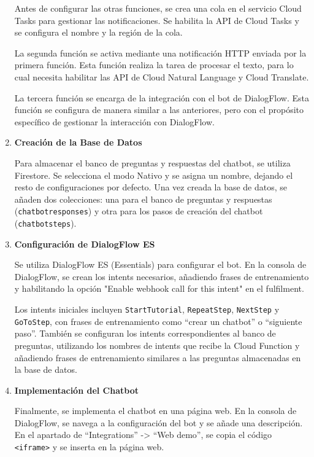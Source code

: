 \begin{enumerate}
Antes de configurar las otras funciones, se crea una cola en el servicio Cloud Tasks para gestionar las notificaciones. Se habilita la API de Cloud Tasks y se configura el nombre y la región de la cola.

La segunda función se activa mediante una notificación HTTP enviada por la primera función. Esta función realiza la tarea de procesar el texto, para lo cual necesita habilitar las API de Cloud Natural Language y Cloud Translate.

La tercera función se encarga de la integración con el bot de DialogFlow. Esta función se configura de manera similar a las anteriores, pero con el propósito específico de gestionar la interacción con DialogFlow.

\item \textbf{Creación de la Base de Datos}

Para almacenar el banco de preguntas y respuestas del chatbot, se utiliza Firestore. Se selecciona el modo Nativo y se asigna un nombre, dejando el resto de configuraciones por defecto. Una vez creada la base de datos, se añaden dos colecciones: una para el banco de preguntas y respuestas (\texttt{chatbotresponses}) y otra para los pasos de creación del chatbot (\texttt{chatbotsteps}).

\item \textbf{Configuración de DialogFlow ES}

Se utiliza DialogFlow ES (Essentials) para configurar el bot. En la consola de DialogFlow, se crean los intents necesarios, añadiendo frases de entrenamiento y habilitando la opción "Enable webhook call for this intent" en el fulfilment.

Los intents iniciales incluyen \texttt{StartTutorial}, \texttt{RepeatStep}, \texttt{NextStep} y \texttt{GoToStep}, con frases de entrenamiento como “crear un chatbot” o “siguiente paso”. También se configuran los intents correspondientes al banco de preguntas, utilizando los nombres de intents que recibe la Cloud Function y añadiendo frases de entrenamiento similares a las preguntas almacenadas en la base de datos.

\item \textbf{Implementación del Chatbot}

Finalmente, se implementa el chatbot en una página web. En la consola de DialogFlow, se navega a la configuración del bot y se añade una descripción. En el apartado de “Integrations” -> “Web demo”, se copia el código \texttt{<iframe>} y se inserta en la página web.


\end{enumerate}
